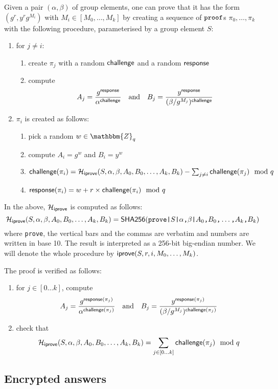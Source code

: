 \documentclass[a4paper]{article}
\newcommand{\Z}{\mathbbm{Z}}
\newcommand{\shatwo}{\textsf{SHA256}}
\begin{document}
Given a pair $(\alpha,\beta)$ of group elements, one can prove that it
has the form $(g^r,y^rg^{M_i})$ with $M_i\in[M_0,\dots,M_k]$ by
creating a sequence of $\texttt{proof}$s $\pi_0,\dots,\pi_k$ with the
following procedure, parameterised by a group element $S$:
\begin{enumerate}
\item for $j\neq i$:
  \begin{enumerate}
  \item create $\pi_j$ with a random $\textsf{challenge}$ and a random
    $\textsf{response}$
  \item compute
    \[A_j=\frac{g^{\textsf{response}}}{\alpha^{\textsf{challenge}}}\quad\text{and}\quad
    B_j=\frac{y^{\textsf{response}}}{(\beta/g^{M_j})^{\textsf{challenge}}}\]
  \end{enumerate}
\item $\pi_i$ is created as follows:
  \begin{enumerate}
  \item pick a random $w\in\Z_q$
  \item compute $A_i=g^w$ and $B_i=y^w$
  \item $\textsf{challenge}(\pi_i)=\mathcal{H}_{\textsf{iprove}}(S,\alpha,\beta,A_0,B_0,\dots,A_k,B_k)-\sum_{j\neq
      i}\textsf{challenge}(\pi_j)\mod q$
  \item $\textsf{response}(\pi_i)=w+r\times\textsf{challenge}(\pi_i)\mod q$
  \end{enumerate}
\end{enumerate}
In the above, $\mathcal{H}_{\textsf{iprove}}$ is computed as follows:
\[\Hash_\iprove(S,\alpha,\beta,A_0,B_0,\dots,A_k,B_k)=\shatwo(\verb=prove|=S\verb=|=\alpha\verb=,=\beta\verb=|=A_0\verb=,=B_0\verb=,=\dots\verb=,=A_k\verb=,=B_k)\]
where \verb=prove=, the vertical bars and the commas are verbatim and
numbers are written in base 10. The result is interpreted as a 256-bit
big-endian number. We will denote the whole procedure by
$\textsf{iprove}(S,r,i,M_0,\dots,M_k)$.

The proof is verified as follows:
\begin{enumerate}
\item for $j\in[0\dots k]$, compute
  \[A_j=\frac{g^{\textsf{response}(\pi_j)}}{\alpha^{\textsf{challenge}(\pi_j)}}\quad\text{and}\quad
  B_j=\frac{y^{\textsf{response}(\pi_j)}}{(\beta/g^{M_j})^{\textsf{challenge}(\pi_j)}}\]
\item check that
  \[\mathcal{H}_{\textsf{iprove}}(S,\alpha,\beta,A_0,B_0,\dots,A_k,B_k)=\sum_{j\in[0\dots
    k]}\textsf{challenge}(\pi_j)\mod q\]
\end{enumerate}

\subsection{Encrypted answers}
\label{answers}
\end{document}
